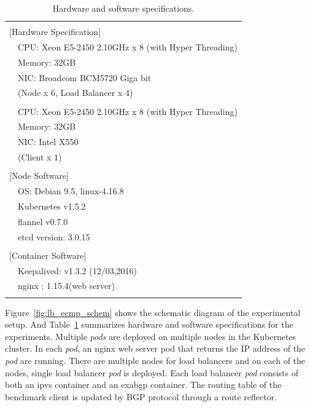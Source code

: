 \begin{table}[b]
  \centering
  \begin{tabular}{ll}
    \hline \\
    \multicolumn{2}{l}{[Hardware Specification]}   \\
    & CPU: Xeon E5-2450 2.10GHz x 8 (with Hyper Threading) \\
    & Memory: 32GB \\
    & NIC: Broadcom BCM5720 Giga bit \\
    & (Node x 6, Load Balancer x 4) \\
    & \\
    & CPU: Xeon E5-2450 2.10GHz x 8 (with Hyper Threading) \\
    & Memory: 32GB \\
    & NIC: Intel X550 \\
    & (Client x 1) \\
    & \\
    \multicolumn{2}{l}{[Node Software]}  \\
    & OS: Debian 9.5, linux-4.16.8 \\
    & Kubernetes v1.5.2 \\
    & flannel v0.7.0 \\
    & etcd version: 3.0.15 \\
    & \\
    \multicolumn{2}{l}{[Container Software]}   \\
    & Keepalived: v1.3.2 (12/03,2016) \\
    & nginx : 1.15.4(web server) \\
    \\ \hline
  \end{tabular}
  \caption{Hardware and software specifications.}
  \label{tab:ecmp-hw_sw_spec}
\end{table}

Figure~\ref{fig:lb_ecmp_schem} shows the schematic diagram of the experimental setup.
And Table~\ref{tab:ecmp-hw_sw_spec} summarizes hardware and software specifications for the experiments.
%
Multiple {\em pods} are deployed on multiple nodes in the Kubernetes cluster.
In each {\em pod}, an nginx web server pod that returns the IP address of the {\em pod} are running.
There are multiple nodes for load balancers and on each of the nodes, single load balancer {\em pod} is deployed.
Each load balancer {\em pod} consists of both an ipvs container and an exabgp container.
The routing table of the benchmark client is updated by BGP protocol through a route reflector.

